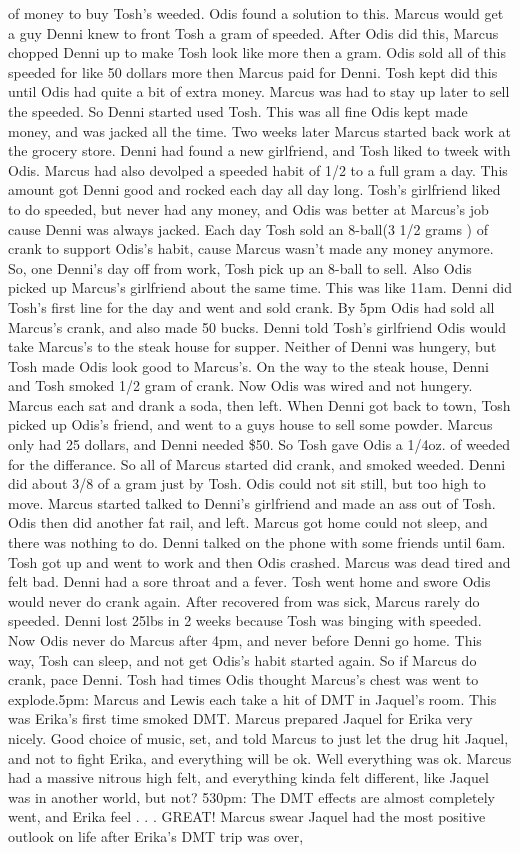\documentclass[12pt]{book}
\begin{document}
of money to buy Tosh's weeded. Odis found a solution to this. Marcus would get a guy Denni knew to front Tosh a gram of speeded. After Odis did this, Marcus chopped Denni up to make Tosh look like more then a gram. Odis sold all of this speeded for like 50 dollars more then Marcus paid for Denni. Tosh kept did this until Odis had quite a bit of extra money. Marcus was had to stay up later to sell the speeded. So Denni started used Tosh. This was all fine Odis kept made money, and was jacked all the time. Two weeks later Marcus started back work at the grocery store. Denni had found a new girlfriend, and Tosh liked to tweek with Odis. Marcus had also devolped a speeded habit of 1/2 to a full gram a day. This amount got Denni good and rocked each day all day long. Tosh's girlfriend liked to do speeded, but never had any money, and Odis was better at Marcus's job cause Denni was always jacked. Each day Tosh sold an 8-ball(3 1/2 grams ) of crank to support Odis's habit, cause Marcus wasn't made any money anymore. So, one Denni's day off from work, Tosh pick up an 8-ball to sell. Also Odis picked up Marcus's girlfriend about the same time. This was like 11am. Denni did Tosh's first line for the day and went and sold crank. By 5pm Odis had sold all Marcus's crank, and also made 50 bucks. Denni told Tosh's girlfriend Odis would take Marcus's to the steak house for supper. Neither of Denni was hungery, but Tosh made Odis look good to Marcus's. On the way to the steak house, Denni and Tosh smoked 1/2 gram of crank. Now Odis was wired and not hungery. Marcus each sat and drank a soda, then left. When Denni got back to town, Tosh picked up Odis's friend, and went to a guys house to sell some powder. Marcus only had 25 dollars, and Denni needed \$50. So Tosh gave Odis a 1/4oz. of weeded for the differance. So all of Marcus started did crank, and smoked weeded. Denni did about 3/8 of a gram just by Tosh. Odis could not sit still, but too high to move. Marcus started talked to Denni's girlfriend and made an ass out of Tosh. Odis then did another fat rail, and left. Marcus got home could not sleep, and there was nothing to do. Denni talked on the phone with some friends until 6am. Tosh got up and went to work and then Odis crashed. Marcus was dead tired and felt bad. Denni had a sore throat and a fever. Tosh went home and swore Odis would never do crank again. After recovered from was sick, Marcus rarely do speeded. Denni lost 25lbs in 2 weeks because Tosh was binging with speeded. Now Odis never do Marcus after 4pm, and never before Denni go home. This way, Tosh can sleep, and not get Odis's habit started again. So if Marcus do crank, pace Denni. Tosh had times Odis thought Marcus's chest was went to explode.5pm: Marcus and Lewis each take a hit of DMT in Jaquel's room. This was Erika's first time smoked DMT. Marcus prepared Jaquel for Erika very nicely. Good choice of music, set, and told Marcus to just let the drug hit Jaquel, and not to fight Erika, and everything will be ok. Well everything was ok. Marcus had a massive nitrous high felt, and everything kinda felt different, like Jaquel was in another world, but not? 530pm: The DMT effects are almost completely went, and Erika feel . . .  GREAT! Marcus swear Jaquel had the most positive outlook on life after Erika's DMT trip was over, 
\end{document}
